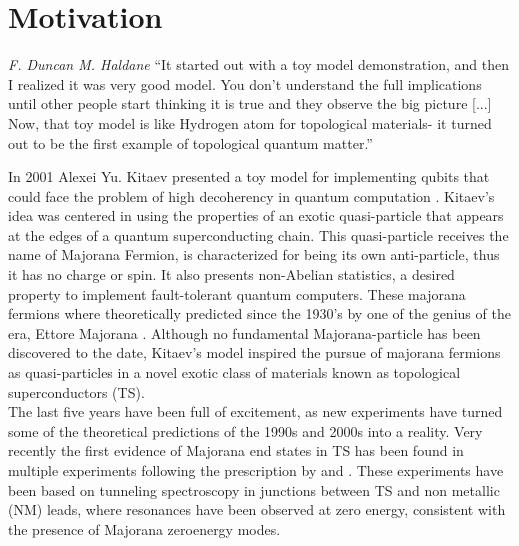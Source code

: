  \chapter{Motivation}

\begin{chapquote}{\textit{F. Duncan M. Haldane}}
``It started out with a toy model demonstration, and then I realized it was very good model.  You don't understand the full implications until other people start thinking it is true and they observe the big picture [...] Now, that toy model is like Hydrogen atom for topological materials- it turned out to be the first example of topological quantum matter.''
\end{chapquote}



In 2001 Alexei Yu. Kitaev presented a toy model for implementing qubits
that could face the problem of high decoherency in quantum computation \citep{kitaev_unpaired_2001}. Kitaev's idea was centered in using the properties of an exotic quasi-particle that appears at the edges of a quantum superconducting chain. This quasi-particle receives the name of Majorana Fermion, is characterized for being its own anti-particle, thus it has no charge or spin. It also presents non-Abelian statistics, a desired property to implement fault-tolerant quantum computers\citep{kitaev_fault-tolerant_2003}. These majorana fermions where theoretically predicted since the 1930's by one of the genius of the era, Ettore Majorana \citep{wilczek_majorana_2009}.
Although no fundamental Majorana-particle has been discovered to the
date, Kitaev's model inspired the pursue of majorana fermions as
quasi-particles in a novel exotic class of materials known as topological
superconductors (TS)\citep{fu_superconducting_2008,sato_non-abelian_2009,alicea_new_2012}.
\\

The last five years have been full of excitement, as new experiments
have turned some of the theoretical predictions of the 1990s and 2000s
into a reality. Very recently the first evidence of Majorana end states
in TS has been found in multiple experiments \citep{mourik_signatures_2012,das_zero-bias_2012,deng_anomalous_2012}
following the prescription by \citet{oreg_helical_2010} and \citet{lutchyn_majorana_2010}.
These experiments have been based on tunneling spectroscopy in junctions
between TS and non metallic (NM) leads, where resonances have been
observed at zero energy, consistent with the presence of Majorana
zero\textendash energy modes.\\


